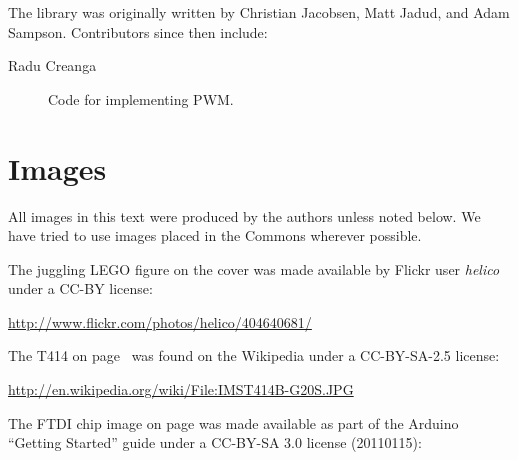 The \plumbing library was originally written by Christian Jacobsen, Matt Jadud, and Adam Sampson. Contributors since then include:

\begin{description}
	\item[Radu Creanga] Code for implementing PWM.
\end{description}

\newpage

\section{Images}
All images in this text were produced by the authors unless noted below. We have tried to use images placed in the Commons wherever possible.

The juggling LEGO figure on the cover was made available by Flickr user {\em helico} under a CC-BY license:

\small{\url{http://www.flickr.com/photos/helico/404640681/}}

The T414 on page~\pageref{image:t414} was found on the Wikipedia under a CC-BY-SA-2.5 license:

\small{\url{http://en.wikipedia.org/wiki/File:IMST414B-G20S.JPG}}

The FTDI chip image on page \pageref{image:ftdi-chip} was made available as part of the Arduino ``Getting Started'' guide under a CC-BY-SA 3.0 license (20110115):

